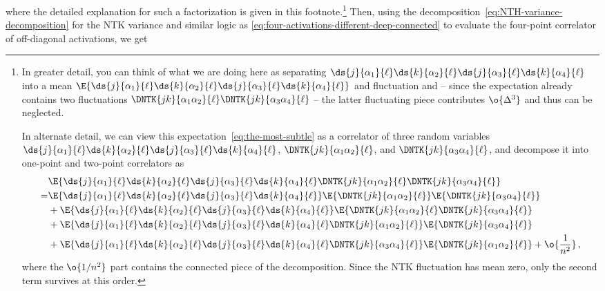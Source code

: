 where the detailed explanation for such a factorization is given in this footnote.\footnote{In greater detail, you can think of what we are doing here as separating $\ds{j}{\alpha_1}{\ell} \ds{k}{\alpha_2}{\ell} \ds{j}{\alpha_3}{\ell} \ds{k}{\alpha_4}{\ell}$ into a mean $\E{\ds{j}{\alpha_1}{\ell} \ds{k}{\alpha_2}{\ell} \ds{j}{\alpha_3}{\ell} \ds{k}{\alpha_4}{\ell}}$ and fluctuation 
and -- since the expectation already contains two fluctuations $\DNTK{jk}{\alpha_1\alpha_2}{\ell}\DNTK{jk}{\alpha_3\alpha_4}{\ell}$ -- the latter fluctuating piece contributes $\o{\Delta^3}$ and thus can be neglected.

In alternate detail, we can view this expectation~\eqref{eq:the-most-subtle} as a correlator of three random variables $\ds{j}{\alpha_1}{\ell} \ds{k}{\alpha_2}{\ell} \ds{j}{\alpha_3}{\ell} \ds{k}{\alpha_4}{\ell}$, $\DNTK{jk}{\alpha_1\alpha_2}{\ell}$, and $\DNTK{jk}{\alpha_3\alpha_4}{\ell}$, and decompose it into one-point and two-point correlators as
\begin{align}\label{eq:correlator-paradise}
&\E{\ds{j}{\alpha_1}{\ell} \ds{k}{\alpha_2}{\ell} \ds{j}{\alpha_3}{\ell} \ds{k}{\alpha_4}{\ell}\DNTK{jk}{\alpha_1\alpha_2}{\ell}\DNTK{jk}{\alpha_3\alpha_4}{\ell} }  \,   \\
=&\E{\ds{j}{\alpha_1}{\ell} \ds{k}{\alpha_2}{\ell} \ds{j}{\alpha_3}{\ell} \ds{k}{\alpha_4}{\ell}} \E{\DNTK{jk}{\alpha_1\alpha_2}{\ell}}\E{\DNTK{jk}{\alpha_3\alpha_4}{\ell} } \, \notag\\
&+\E{\ds{j}{\alpha_1}{\ell} \ds{k}{\alpha_2}{\ell} \ds{j}{\alpha_3}{\ell} \ds{k}{\alpha_4}{\ell}} \E{\DNTK{jk}{\alpha_1\alpha_2}{\ell}\DNTK{jk}{\alpha_3\alpha_4}{\ell} } \, \notag  \\
&+\E{\ds{j}{\alpha_1}{\ell} \ds{k}{\alpha_2}{\ell} \ds{j}{\alpha_3}{\ell} \ds{k}{\alpha_4}{\ell} \DNTK{jk}{\alpha_1\alpha_2}{\ell}}\E{\DNTK{jk}{\alpha_3\alpha_4}{\ell} }
 \, \notag \\
&+\E{\ds{j}{\alpha_1}{\ell} \ds{k}{\alpha_2}{\ell} \ds{j}{\alpha_3}{\ell} \ds{k}{\alpha_4}{\ell} \DNTK{jk}{\alpha_3\alpha_4}{\ell}}\E{\DNTK{jk}{\alpha_1\alpha_2}{\ell} } + \o{\frac{1}{n^2}}\, \notag ,
\end{align}
where the $\o{1/n^2}$ part contains the connected piece of the decomposition.
Since the NTK fluctuation has mean zero, only the second term survives at this order.}
Then, using the decomposition~\eqref{eq:NTH-variance-decomposition} for the NTK variance and similar logic as \eqref{eq:four-activations-different-deep-connected} to evaluate the four-point correlator of off-diagonal activations, we get
